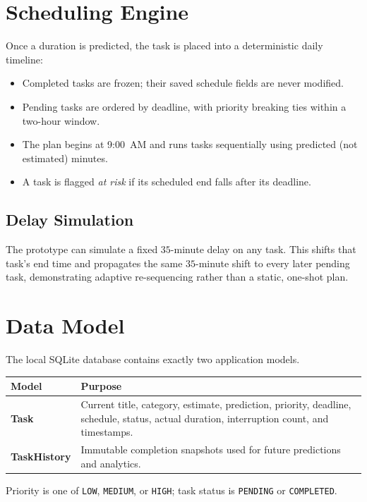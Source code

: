 \documentclass[11pt,a4paper]{article}
\begin{document}
\section{Scheduling Engine}
Once a duration is predicted, the task is placed into a deterministic daily timeline:
\begin{itemize}
    \item Completed tasks are frozen; their saved schedule fields are never modified.
    \item Pending tasks are ordered by deadline, with priority breaking ties within a two-hour window.
    \item The plan begins at 9:00~AM and runs tasks sequentially using predicted (not estimated)
    minutes.
    \item A task is flagged \emph{at risk} if its scheduled end falls after its deadline.
\end{itemize}

\subsection{Delay Simulation}
The prototype can simulate a fixed $35$-minute delay on any task. This shifts that task's end time and
propagates the same $35$-minute shift to every later pending task, demonstrating adaptive
re-sequencing rather than a static, one-shot plan.

\section{Data Model}
The local SQLite database contains exactly two application models.

\begin{center}
\begin{tabularx}{\textwidth}{>{\bfseries}l X}
\toprule
\textbf{Model} & \textbf{Purpose} \\
\midrule
Task & Current title, category, estimate, prediction, priority, deadline, schedule, status, actual
duration, interruption count, and timestamps. \\
TaskHistory & Immutable completion snapshots used for future predictions and analytics. \\
\bottomrule
\end{tabularx}
\end{center}

Priority is one of \texttt{LOW}, \texttt{MEDIUM}, or \texttt{HIGH}; task status is \texttt{PENDING} or
\texttt{COMPLETED}.
\end{document}
